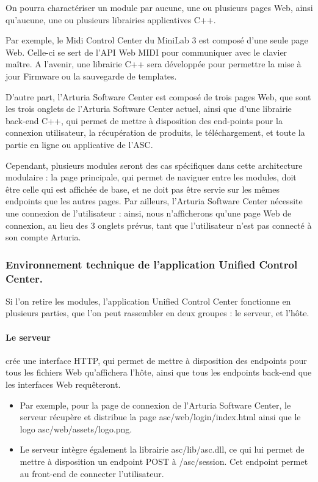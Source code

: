 \documentclass[francais]{rapportPFE}  %
\begin{document}
On pourra charactériser un module par aucune, une ou plusieurs pages Web, ainsi qu'aucune, une ou plusieurs librairies applicatives C++.

Par exemple, le Midi Control Center du MiniLab 3 est composé d'une seule page Web. Celle-ci se sert de l'API Web MIDI pour communiquer avec le clavier maître. A l'avenir, une librairie C++ sera développée pour permettre la mise à jour Firmware ou la sauvegarde de templates.

D'autre part, l'Arturia Software Center est composé de trois pages Web, que sont les trois onglets de l'Arturia Software Center actuel, ainsi que d'une librairie back-end C++, qui permet de mettre à disposition des end-points pour la connexion utilisateur, la récupération de produits, le téléchargement, et toute la partie en ligne ou applicative de l'ASC.

Cependant, plusieurs modules seront des cas spécifiques dans cette architecture modulaire :
la page principale, qui permet de naviguer entre les modules, doit être celle qui est affichée de base, et ne doit pas être servie sur les mêmes endpoints que les autres pages.
Par ailleurs, l'Arturia Software Center nécessite une connexion de l'utilisateur : ainsi, nous n'afficherons qu'une page Web de connexion, au lieu des 3 onglets prévus, tant que l'utilisateur n'est pas connecté à son compte Arturia.



\subsubsection{Environnement technique de l'application Unified Control Center.}

Si l'on retire les modules, l'application Unified Control Center fonctionne en plusieurs parties, que l'on peut rassembler en deux groupes : le serveur, et l'hôte.

\paragraph{Le serveur} crée une interface HTTP, qui permet de mettre à disposition des endpoints pour tous les fichiers Web qu'affichera l'hôte, ainsi que tous les endpoints back-end que les interfaces Web requêteront.
\begin{itemize}
    \item Par exemple, pour la page de connexion de l'Arturia Software Center, le serveur récupère et distribue la page asc/web/login/index.html ainsi que le logo asc/web/assets/logo.png. 
    \item Le serveur intègre également la librairie asc/lib/asc.dll, ce qui lui permet de mettre à disposition un endpoint POST à /asc/session. Cet endpoint permet au front-end de connecter l'utilisateur.
\end{itemize}
\end{document}
